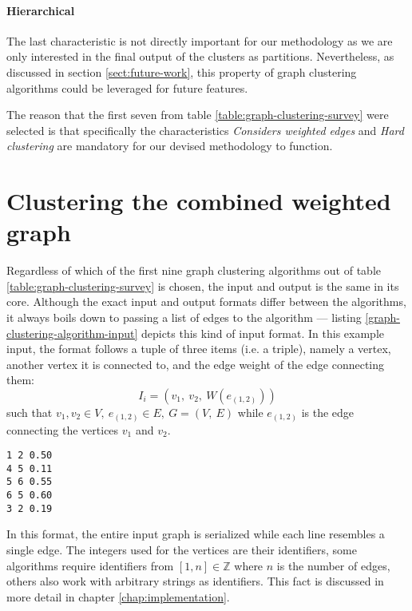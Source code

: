 \documentclass[12pt,a4paper]{report}
\begin{document}
\paragraph{Hierarchical}
The last characteristic is not directly important for our methodology
as we are only interested in the final output of the clusters as partitions.
Nevertheless, as discussed in section \ref{sect:future-work},
this property of graph clustering algorithms could be leveraged for future features.
\newline

The reason that the first seven from table \ref{table:graph-clustering-survey}
were selected is that specifically the characteristics
\textit{Considers weighted edges} and \textit{Hard clustering} are mandatory
for our devised methodology to function.



\section{Clustering the combined weighted graph}

Regardless of which of the first nine graph clustering algorithms out of
table \ref{table:graph-clustering-survey} is chosen, the input and output
is the same in its core.
Although the exact input and output formats differ between the algorithms,
it always boils down to passing a list of edges to the algorithm ---
listing \ref{graph-clustering-algorithm-input} depicts this kind of input format.
In this example input, the format follows a tuple of three items (i.e. a triple),
namely a vertex, another vertex it is connected to, and the edge weight of the
edge connecting them:
\[
  I_i = (v_1, \ v_2, \ W(e_{(1,2)}))
\]
such that \(v_1, v_2 \in V, \ e_{(1,2)} \in E, \ G = (V, \ E)\) while
\(e_{(1,2)}\) is the edge connecting the vertices \(v_1\) and \(v_2\).

\begin{lstlisting}[caption=Example graph clustering algorithm input, label=graph-clustering-algorithm-input, breaklines=true]
1 2 0.50
4 5 0.11
5 6 0.55
6 5 0.60
3 2 0.19
\end{lstlisting}

In this format, the entire input graph is serialized while each line resembles
a single edge. The integers used for the vertices are their identifiers,
some algorithms require identifiers from \([1, n] \in \mathbb{Z}\) where \(n\)
is the number of edges, others also work with arbitrary strings as identifiers.
This fact is discussed in more detail in chapter \ref{chap:implementation}.
\end{document}
